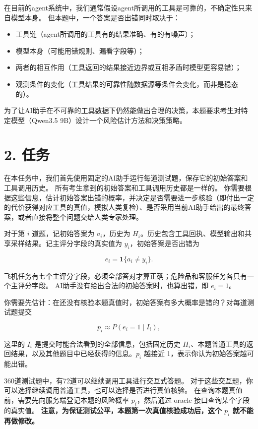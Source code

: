 \documentclass[11pt,a4paper]{article}
\begin{document}
在目前的agent系统中，我们通常假设agent所调用的工具是可靠的，不确定性只来自模型本身。
但本题中，一个答案是否出错同时取决于：
\begin{itemize}
  \item 工具链（agent所调用的工具有的结果准确、有的有噪声）；
  \item 模型本身（可能用错规则、漏看字段等）；
  \item 两者的相互作用（工具返回的结果接近边界或互相矛盾时模型更容易错）；
  \item 观测条件的变化（工具结果的可靠性随数据源等条件会变化，而非是稳态的）。
\end{itemize}
为了让AI助手在不可靠的工具数据下仍然能做出合理的决策，本题要求考生对特定模型（Qwen3.5 9B）设计一个风险估计方法和决策策略。


\section{2. 任务}\label{ux4efbux52a1}

在本任务中，我们首先使用固定的AI助手运行每道测试题，保存它的初始答案和工具调用历史。
所有考生拿到的初始答案和工具调用历史都是一样的。
你需要根据这些信息，估计初始答案出错的概率，并决定是否需要进一步核验（即付出一定的代价获得对应工具的真值，模拟人类复检）、是否采用当前AI助手给出的最终答案，或者直接将整个问题交给人类专家处理。

对于第 \(i\) 道题，记初始答案为 \(a_i\)，历史为
\(H_i\)。历史包含工具回执、模型输出和共享采样结果。记主评分字段的真实值为
\(y_i\)，初始答案是否出错为

\[
e_i=\mathbf 1\{a_i\neq y_i\}.
\]

飞机任务有七个主评分字段，必须全部答对才算正确；危险品和客服任务各只有一个主评分字段。
AI助手没有给出合法的初始答案时，也算出错，即 \(e_i=1\)。

你需要先估计：在还没有核验本题真值时，初始答案有多大概率是错的？对每道测试题提交

\[
p_i\approx P(e_i=1\mid I_i),
\]

这里的 \(I_i\) 是提交时能合法看到的全部信息，包括固定历史
\(H_i\)、本题普通工具的返回结果，以及其他题目中已经获得的信息。\(p_i\)
越接近 1，表示你认为初始答案越可能出错。

360道测试题中，有72道可以继续调用工具进行交互式答题。
对于这些交互题，你可以选择继续调用普通工具，也可以选择是否进行真值核验。
在查询本题真值前，需要先向服务端登记本题的风险概率 \(p_i\)，然后通过 oracle 接口查询某个字段的真实值。
\textbf{注意，为保证测试公平，本题第一次真值核验成功后，这个 \(p_i\) 就不能再做修改。}
\end{document}

